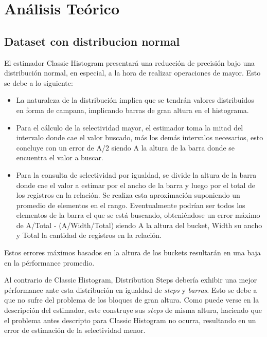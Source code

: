 \documentclass[a4paper, 10pt, twoside]{article}
\begin{document}


\section{Análisis Teórico}

\subsection{Dataset con distribucion normal}
El estimador Classic Histogram presentará una reducción de precisión bajo una distribución normal, en especial, a la hora de realizar operaciones de mayor. Esto se debe a lo siguiente:

\begin{itemize}
\item La naturaleza de la distribución implica que se tendrán valores distribuidos en forma de campana, implicando barras de gran altura en el histograma.
\item Para el cálculo de la selectividad mayor, el estimador toma la mitad del intervalo donde cae el valor buscado, más los demás intervalos necesarios, esto concluye con un error de A/2 siendo A la altura de la barra donde se encuentra el valor a buscar.
\item Para la consulta de selectividad por igualdad, se divide la altura de la barra donde cae el valor a estimar por el ancho de la barra y luego por el total de los registros en la relación. Se realiza esta aproximación suponiendo un promedio de elementos en el rango. Eventualmente podrían ser todos los elementos de la barra el que se está buscando, obteniéndose un error máximo de A/Total - (A/Width/Total) siendo A la altura del bucket, Width su ancho y Total la cantidad de registros en la relación.
\end{itemize}

Estos errores máximos basados en la altura de los buckets resultarán en una baja en la pérformance promedio.

Al contrario de Classic Histogram, Distribution Steps debería exhibir una mejor pérformance ante esta distribución en igualdad de \textit{steps} y \textit{barras}. Esto se debe a que no sufre del problema de los bloques de gran altura. Como puede verse en la descripción del estimador, este construye sus \textit{steps} de misma altura, haciendo que el problema antes descripto para Classic Histogram no ocurra, resultando en un error de estimación de la selectividad menor.
\end{document}
